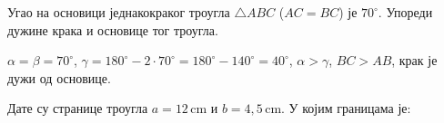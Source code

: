\documentclass[10pt,a5paper,addpoints]{exam}
\def\grupa#1#2#3#4{#1}
\begin{document}
\begin{questions}
\question[2] %
 Угао \grupa{на основици}{при врху}{на основици}{при врху}
 једнакокраког троугла
 $\triangle ABC$ ($AC=BC$) је $\grupa 7557 0^\circ$.
 Упореди дужине крака и основице тог троугла.
 \begin{solution} \centering
  \grupa{
   $\alpha = \beta = 70^\circ$,\qquad
   $\gamma = 180^\circ - 2 ⋅ 70^\circ
   = 180^\circ - 140^\circ = 40^\circ$,\qquad
   $\alpha > \gamma$,\qquad
   $BC > AB$,\qquad
   крак је дужи од основице.
  }{
   $\gamma = 50^\circ$,\qquad
   $\alpha + \beta = 180^\circ - 50^\circ = 130^\circ$,\qquad
   $\alpha = 130^\circ : 2 = 65^\circ$,\qquad
   $\alpha > \gamma$,\qquad
   $BC > AB$,\qquad
   крак је дужи од основице.
  }{
   $\alpha = \beta = 50^\circ$,\qquad
   $\gamma = 180^\circ - 2 ⋅ 50^\circ
   = 180^\circ - 100^\circ = 80^\circ$,\qquad
   $\alpha < \gamma$,\qquad
   $BC < AB$,\qquad
   крак је краћи од основице.
  }{
   $\gamma = 70^\circ$,\qquad
   $\alpha + \beta = 180^\circ - 70^\circ = 110^\circ$,\qquad
   $\alpha = 110^\circ : 2 = 55^\circ$,\qquad
   $\alpha < \gamma$,\qquad
   $BC < AB$,\qquad
   крак је краћи од основице.
  }
 \end{solution}

\question %
 Дате су странице троугла
 $a = \grupa{12}{10,\!5}{10}{11,\!5} \,\mathrm{cm}$ и
 $\grupa bccb = \grupa{4,\!5}4{6,\!5}5 \,\mathrm{cm}$.
 У којим гра\-ни\-ца\-ма је:
\end{questions}
\end{document}
